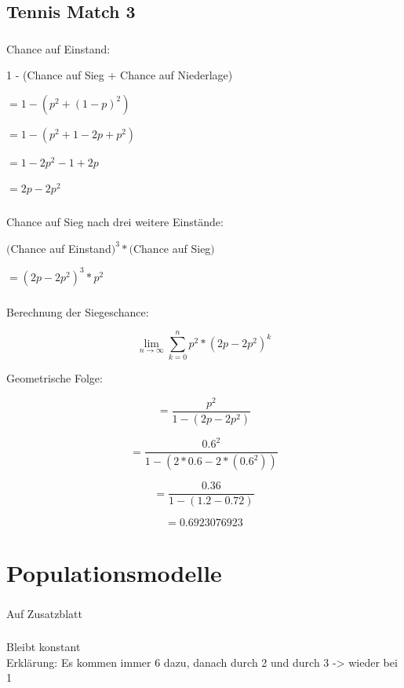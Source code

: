 \documentclass{article}
\begin{document}
\subsection{Tennis Match 3}

\subsubsection{}
Chance auf Einstand:

1 - (Chance auf Sieg + Chance auf Niederlage)

$= 1 - (p^2 + (1-p)^2)$

$= 1 - (p^2 + 1 - 2p + p^2)$

$= 1 - 2p^2 - 1 + 2p$

$= 2p - 2p^2$

\subsubsection{}
Chance auf Sieg nach drei weitere Einstände:

$($Chance auf Einstand$)^3 * ($Chance auf Sieg$)$

$= (2p - 2p^2)^3 * p^2$

\subsubsection{}
Berechnung der Siegeschance:

$$\lim_{n\to\infty} \sum_{k=0}^{n} p^2 * (2p-2p^2)^k$$

Geometrische Folge:

\[=\frac{p^2}{1-(2p-2p^2)}\]

\[=\frac{0.6^2}{1-(2*0.6-2*(0.6^2))}\]

\[=\frac{0.36}{1-(1.2-0.72)}\]

\[=0.6923076923\]

\subsubsection{}

\section{Populationsmodelle}
\subsubsection{}
Auf Zusatzblatt
\subsubsection{}
Bleibt konstant \\
Erklärung: Es kommen immer 6 dazu, danach durch 2 und durch 3 -> wieder bei 1
\end{document}
